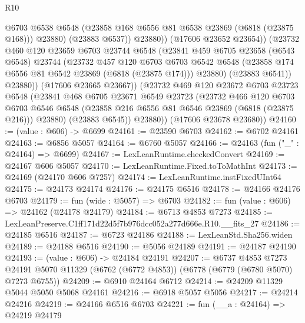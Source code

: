 \begin{lexlean}{R10}
\begin{coremodule}
                      @6703
                      @6538
                      @6548
                      (@23858 @168 @6556 @81 @6538 @23869 (@6818 (@23875 @168)))
                      @23880)
                    (@23883 @6537))
                  @23880))
              (@17606 @23652 @23654))
            (@23732
              @460
              @120
              @23659
              @6703
              @23744
              @6548
              (@23841
                @459
                @6705
                @23658
                (@6543 @6548)
                @23744
                (@23732
                  @457
                  @120
                  @6703
                  @6703
                  @6542
                  @6548
                  (@23858 @174 @6556 @81 @6542 @23869 (@6818 (@23875 @174)))
                  @23880)
                (@23883 @6541))
              @23880))
          (@17606 @23665 @23667))
        (@23732
          @469
          @120
          @23672
          @6703
          @23723
          @6548
          (@23841
            @468
            @6705
            @23671
            @6549
            @23723
            (@23732
              @466
              @120
              @6703
              @6703
              @6546
              @6548
              (@23858 @216 @6556 @81 @6546 @23869 (@6818 (@23875 @216)))
              @23880)
            (@23883 @6545))
          @23880))
      (@17606 @23678 @23680))
@24160 := (value : @606) -> @6699
@24161 := @23590 @6703
@24162 := @6702 @24161
@24163 := @6856 @5057
@24164 := @6760 @5057
@24166 := @24163 (fun ("_" : @24164) => @6699)
@24167 := LexLeanRuntime.checkedConvert
@24169 := @24167 @606 @5057
@24170 := LexLeanRuntime.Fixed.toToMathInt
@24173 := @24169 (@24170 @606 @7257)
@24174 := LexLeanRuntime.instFixedUInt64
@24175 := @24173 @24174
@24176 := @24175 @6516
@24178 := @24166 @24176 @6703
@24179 := fun (wide : @5057) => @6703
@24182 := fun (value : @606) => @24162 (@24178 @24179)
@24184 := @6713 @4853 @7273
@24185 := LexLeanPreserve.C1ff171d22d5f7b976dcc052a277d666e.R10.__fits_27
@24186 := @24185 @6516
@24187 := @6723 @24186
@24188 := LexLeanStd.Sha256.widen
@24189 := @24188 @6516
@24190 := @5056 @24189
@24191 := @24187 @24190
@24193 := (value : @606) -> @24184 @24191
@24207 := @6737
    @4853
    @7273
    @24191
    @5070
    @11329
    (@6762 (@6772 @4853))
    (@6778 (@6779 (@6780 @5070) @7273 @6755))
@24209 := @6910 @24164 @6712
@24214 := @24209 @11329 @5044 @5050 @5068 @24161
@24216 := @6918 @5057 @5056
@24217 := @24214 @24216
@24219 := @24166 @6516 @6703
@24221 := fun (__a : @24164) => @24219 @24179

\end{coremodule}
\end{lexlean}
